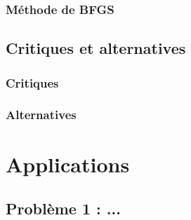 \documentclass[3p, twocolumn]{elsarticle}
\begin{document}
\subsubsection{Méthode de BFGS}
\subsection{Critiques et alternatives}
\subsubsection{Critiques}
\subsubsection{Alternatives}
\section{Applications}
\subsection{Problème 1 : ...}
\end{document}
